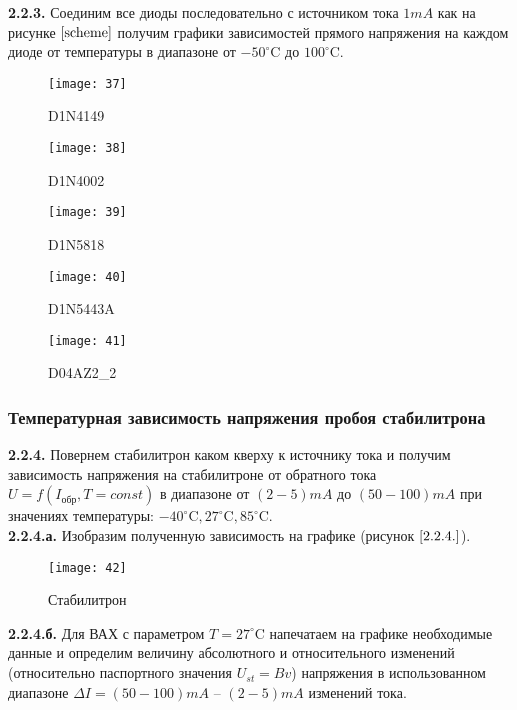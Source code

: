 \documentclass{semi}
\newcommand{\Cd}{^{\circ}\mathrm{C}}
\begin{document}
\textbf{{\normalsize 2.2.3.}}
Соединим все диоды последовательно с источником тока $ 1mA $ как на рисунке $ \ref{scheme} $  получим графики зависимостей прямого напряжения на каждом диоде от температуры в диапазоне от $ -50 \Cd $ до $ 100 \Cd $.
\begin{figure}[H]
	\centering
	\texttt{[image: 37]}
	\caption{D1N4149}
	\label{2.2.3.1}
\end{figure}
\begin{figure}[H]
	\centering
	\texttt{[image: 38]}
	\caption{D1N4002}
	\label{2.2.3.2}
\end{figure}
\begin{figure}[H]
	\centering
	\texttt{[image: 39]}
	\caption{D1N5818}
	\label{2.2.3.3}
\end{figure}
\begin{figure}[H]
	\centering
	\texttt{[image: 40]}
	\caption{D1N5443A}
	\label{2.2.3.4}
\end{figure}
\begin{figure}[H]
	\centering
	\texttt{[image: 41]}
	\caption{D04AZ2\_2}
	\label{2.2.3.5}
\end{figure}

\subsubsection*{Температурная зависимость напряжения пробоя стабилитрона}

\textbf{{\normalsize 2.2.4.}}
Повернем стабилитрон каком кверху к источнику тока и получим зависимость напряжения на стабилитроне от обратного тока $ U = f(I_{обр}, T = const) $ в диапазоне от $ (2-5) mA $ до $ (50 - 100)mA $ при значениях температуры: $ -40 \Cd, 27 \Cd, 85 \Cd $.\\

\textbf{{\normalsize 2.2.4.а.}}
Изобразим полученную зависимость на графике (рисунок $ \ref{2.2.4.} $).
\begin{figure}[H]
	\centering
	\texttt{[image: 42]}
	\caption{Стабилитрон}
	\label{2.2.4.}
\end{figure}

\newpage

\textbf{{\normalsize 2.2.4.б.}}
Для ВАХ с параметром $ T = 27 \Cd $ напечатаем на графике необходимые данные и определим величину абсолютного и относительного изменений (относительно паспортного значения $ U_{st} = Bv $) напряжения в использованном диапазоне $ \Delta I = (50-100) mA $ -- $ (2-5) mA $ изменений тока.
\end{document}
